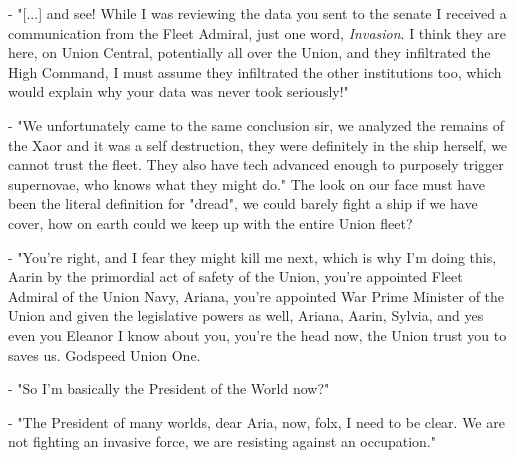 \documentclass[colorlinks,12pt,a4paper]{book}
\begin{document}
- "[...] and see! While I was reviewing the data you sent to the senate I received a communication from the Fleet Admiral, just one 
word, \textit{Invasion}. I think they are here, on Union Central, potentially all over the Union, and they infiltrated the High Command,
I must assume they infiltrated the other institutions too, which would explain why your data was never took seriously!"\newline\par
- "We unfortunately came to the same conclusion sir, we analyzed the remains of the Xaor and it was a self destruction, they were 
definitely in the ship herself, we cannot trust the fleet. They also have tech advanced enough to purposely trigger supernovae, 
who knows what they might do." The look on our face must have been the literal definition for "dread", we could barely fight a ship if 
we have cover, how on earth could we keep up with the entire Union fleet?\newline\par
- "You're right, and I fear they might kill me next, which is why I'm doing this, Aarin by the primordial act of safety of the Union, 
you're appointed Fleet Admiral of the Union Navy, Ariana, you're appointed War Prime Minister of the Union and given the legislative powers
as well, Ariana, Aarin, Sylvia, and yes even you Eleanor I know about you, you're the head now, the Union trust you to saves us. Godspeed Union One.\newline\par
\bigskip
- "So I'm basically the President of the World now?"\par
- "The President of many worlds, dear Aria, now, folx, I need to be clear. We are not fighting an invasive force, 
we are resisting against an occupation."

\printglossaries
\end{document}
